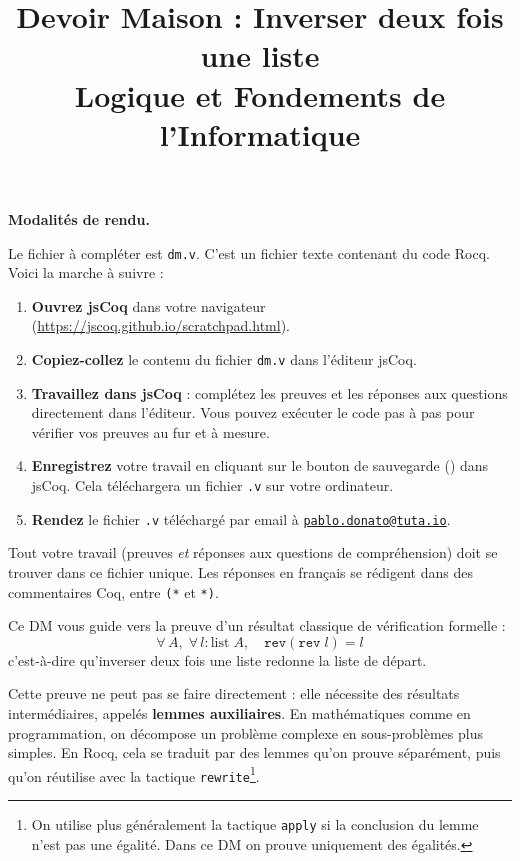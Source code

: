 \documentclass[11pt,a4paper]{article}
\title{%
  \vspace{-1.5cm}%
  \textbf{Devoir Maison : Inverser deux fois une liste}\\[0.4em]
  \large Logique et Fondements de l'Informatique%
}
\date{}
\author{}
\newenvironment{rappel}{
\begin{mdframed}[style=rappelstyle]}{
\end{mdframed}}
\newcommand{\cq}[1]{\texttt{#1}}
\begin{document}
\maketitle
\vspace{-1.2cm}

\begin{rappel}
  \textbf{Modalités de rendu.}

  Le fichier à compléter est \texttt{dm.v}. C'est un fichier texte contenant du
  code Rocq. Voici la marche à suivre :

  \begin{enumerate}[noitemsep,topsep=4pt]
    \item \textbf{Ouvrez jsCoq} dans votre navigateur
      (\url{https://jscoq.github.io/scratchpad.html}).
    \item \textbf{Copiez-collez} le contenu du fichier \texttt{dm.v} dans
      l'éditeur jsCoq.
    \item \textbf{Travaillez dans jsCoq} : complétez les preuves et les réponses
      aux questions directement dans l'éditeur. Vous pouvez exécuter le code pas
      à pas pour vérifier vos preuves au fur et à mesure.
    \item \textbf{Enregistrez} votre travail en cliquant sur le bouton
      de sauvegarde (\faDownload) dans jsCoq. Cela téléchargera un fichier
      \texttt{.v} sur votre ordinateur.
    \item \textbf{Rendez} le fichier \texttt{.v} téléchargé par email à
      \href{mailto:pablo.donato@tuta.io}{\texttt{pablo.donato@tuta.io}}.
  \end{enumerate}

  Tout votre travail (preuves \emph{et} réponses aux questions de compréhension)
  doit se trouver dans ce fichier unique. Les réponses en français se rédigent
  dans des commentaires Coq, entre \cq{(*} et \cq{*)}.
\end{rappel}

\bigskip

Ce DM vous guide vers la preuve d'un résultat classique de vérification
formelle :
\[
  \forall\, A,\; \forall\, l : \mathrm{list}\;A, \quad
  \cq{rev}(\cq{rev}\; l) = l
\]
c'est-à-dire qu'inverser deux fois une liste redonne la liste de départ.

Cette preuve ne peut pas se faire directement : elle nécessite des résultats intermédiaires, appelés
\textbf{lemmes auxiliaires}. En mathématiques comme en programmation, on décompose un problème
complexe en sous-problèmes plus simples. En Rocq, cela se traduit par des lemmes qu'on prouve
séparément, puis qu'on réutilise avec la tactique \cq{rewrite}\footnote{On utilise plus généralement
  la tactique \cq{apply} si la conclusion du lemme n'est pas une égalité. Dans ce DM on prouve
uniquement des égalités.}.
\end{document}
